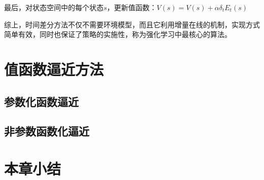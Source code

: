 最后，对状态空间中的每个状态$s$，更新值函数：$V(s)=V(s)+\alpha \delta_{t} E_{t}(s)$

综上，时间差分方法不仅不需要环境模型，而且它利用增量在线的机制，实现方式简单有效，同时也保证了策略的实施性，称为强化学习中最核心的算法。

\section{值函数逼近方法}
\subsection{参数化函数逼近}
\subsection{非参数函数化逼近}

\section{本章小结}
 